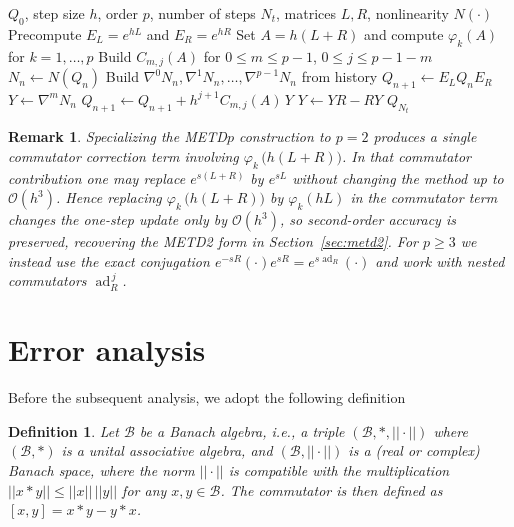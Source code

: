 \documentclass[12pt]{article}
\newtheorem{defi}{Definition}
\newtheorem{rmk}{Remark}
\DeclareMathOperator{\ad}{ad}
\begin{document}
\begin{algorithm}[t]
\caption{Arbitrary order METD$p$}
\label{alg:metdp}
\begin{algorithmic}[1]
\REQUIRE $Q_0$, step size $h$, order $p$, number of steps $N_t$, matrices $L,R$, nonlinearity $N(\cdot)$
\STATE Precompute $E_L=e^{hL}$ and $E_R=e^{hR}$
\STATE Set $A=h(L+R)$ and compute $\varphi_k(A)$ for $k=1,\ldots,p$
\STATE Build $C_{m,j}(A)$ for $0\le m\le p-1$, $0\le j\le p-1-m$
    \STATE $N_n \leftarrow N(Q_n)$
    \STATE Build $\nabla^0 N_n,\nabla^1 N_n,\ldots,\nabla^{p-1}N_n$ from history
    \STATE $Q_{n+1} \leftarrow E_L Q_n E_R$
        \STATE $Y \leftarrow \nabla^m N_n$
            \STATE $Q_{n+1} \leftarrow Q_{n+1} + h^{j+1} C_{m,j}(A)\,Y$
            \STATE $Y \leftarrow YR-RY$
        \ENDFOR
    \ENDFOR
\ENDFOR
\RETURN $Q_{N_t}$
\end{algorithmic}
\end{algorithm}


\begin{rmk}
\label{rmk:metd2_consistency}
Specializing the METD$p$ construction to $p=2$ produces a single commutator correction term involving
$\varphi_k\,\big(h(L+R)\big)$. In that commutator contribution one may replace $e^{s(L+R)}$ by $e^{sL}$
without changing the method up to $\mathcal{O}(h^3)$. Hence replacing $\varphi_k\,\big(h(L+R)\big)$ by $\varphi_k(hL)$ in the
commutator term changes the one-step update only by $\mathcal{O}(h^3)$, so second-order accuracy is
preserved, recovering the METD2 form in Section~\ref{sec:metd2}. For $p\ge 3$ we instead use the exact
conjugation $e^{-sR}(\cdot)e^{sR}=e^{s\ad_R}(\cdot)$ and work with nested commutators $\ad_R^{\,j}$.
\end{rmk}



\section{Error analysis}
\label{sec:error}



Before the subsequent analysis, we adopt the following definition

\begin{defi}\label{def:1}
    Let $\mathcal{B}$ be a Banach algebra, i.e., a triple $(\mathcal{B}, \ast, ||\cdot||)$ where $(\mathcal{B}, \ast)$ is a unital associative algebra, and $(\mathcal{B},||\cdot||)$ is a (real or complex) Banach space, where the norm $||\cdot||$ is compatible with the multiplication $||x \ast y|| \leq ||x||\,||y||$ for any $x,y \in \mathcal{B}$. The commutator is then defined as $[x,y] = x \ast y - y \ast x$.
\end{defi}
\end{document}
